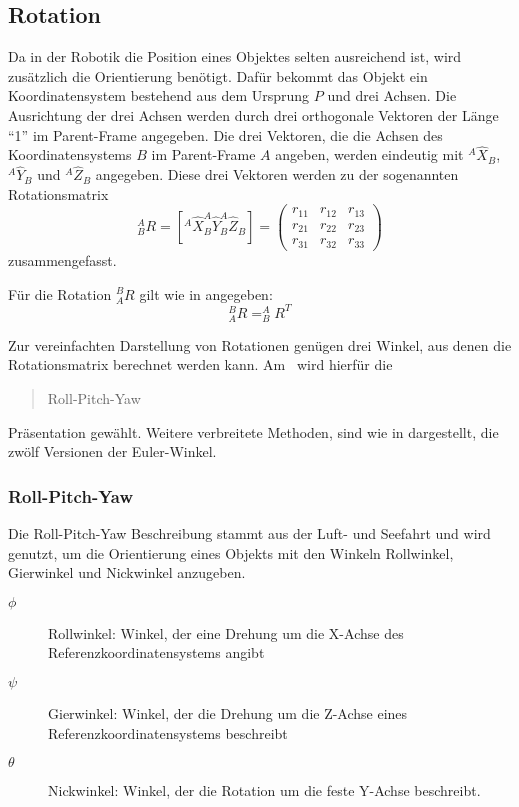 \subsection{Rotation}
\label{sub:Rotation}

Da in der Robotik die Position eines Objektes selten ausreichend ist, wird zusätzlich 
die Orientierung benötigt. Dafür bekommt das Objekt ein Koordinatensystem bestehend
aus dem Ursprung $P$ und drei Achsen. Die Ausrichtung der drei Achsen werden durch
drei orthogonale Vektoren der Länge "`1"' im Parent-Frame angegeben.
Die drei Vektoren, die die Achsen des Koordinatensystems $B$ im Parent-Frame
$A$ angeben, werden eindeutig mit $^A\hat{X}_B$, $^A\hat{Y}_B$ und $^A\hat{Z}_B$
angegeben. Diese drei Vektoren werden zu der sogenannten Rotationsmatrix
\begin{equation}
  ^A_BR = [ ^A\hat{X}_B ^A\hat{Y}_B ^A\hat{Z}_B ] = \begin{pmatrix}
    r_{11}&r_{12}&r_{13}\\
    r_{21}&r_{22}&r_{23}\\
    r_{31}&r_{32}&r_{33}
  \end{pmatrix}
  \label{eq:rotationsmatrix}
\end{equation}
zusammengefasst.

Für die Rotation $^B_AR$ gilt wie in \cite{craig2005} angegeben:
\begin{equation}
  ^B_AR=^A_BR^T
\end{equation}


Zur vereinfachten Darstellung von Rotationen genügen drei Winkel, aus denen die
Rotationsmatrix berechnet werden kann. Am \cob\ wird hierfür die \begin{quote}Roll-Pitch-Yaw\end{quote}
Präsentation gewählt. Weitere verbreitete Methoden, sind wie in \cite{sciavicco2000modelling} 
dargestellt, die zwölf Versionen der Euler-Winkel.

\subsubsection{Roll-Pitch-Yaw}
\label{ssub:Roll-Pitch-Yaw}

Die Roll-Pitch-Yaw Beschreibung stammt aus der Luft- und Seefahrt und wird genutzt,
um die Orientierung eines Objekts mit den Winkeln Rollwinkel, Gierwinkel und 
Nickwinkel anzugeben.
\begin{description}
  \item[$\phi$]Rollwinkel: Winkel, der eine Drehung um die X-Achse des Referenzkoordinatensystems
    angibt
  \item[$\psi$]Gierwinkel: Winkel, der die Drehung um die Z-Achse eines Referenzkoordinatensystems
    beschreibt
  \item[$\theta$]Nickwinkel: Winkel, der die Rotation um die feste Y-Achse beschreibt.

\end{description}


